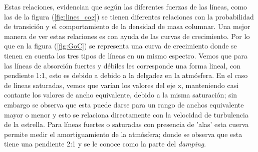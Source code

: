 \documentclass[12pt,oneside,openany,letter]{book}
\begin{document}
Estas relaciones, evidencian que según las diferentes fuerzas de las líneas, como las de la figura (\ref{fig:lines_cog}) se tienen diferentes relaciones con la probabilidad de transición y el comportamiento de la densidad de masa columnar.  Una mejor manera de ver estas relaciones es con ayuda de las curvas de crecimiento. Por lo que en la figura (\ref{fig:GoC}) se representa una curva de crecimiento donde se tienen en cuenta los tres tipos de líneas en un mismo espectro. Vemos que para las líneas de absorción fuertes y débiles les corresponde una forma lineal, con pendiente 1:1, esto es debido a debido a la delgadez en la atmósfera. En el caso de líneas saturadas, vemos que varían los valores del eje x, manteniendo casi contante los valores de ancho equivalente, debido a la misma saturación; sin embargo se observa que esta puede darse para un rango de anchos equivalente mayor o menor y esto se relaciona directamente con la velocidad de turbulencia de la estrella. Para líneas fuertes o saturadas con presencia de 'alas' esta cuerva permite medir el amortiguamiento de la atmósfera; donde se observa que esta tiene una pendiente 2:1 y se le conoce como la parte del \textit{damping}.

\end{document}
